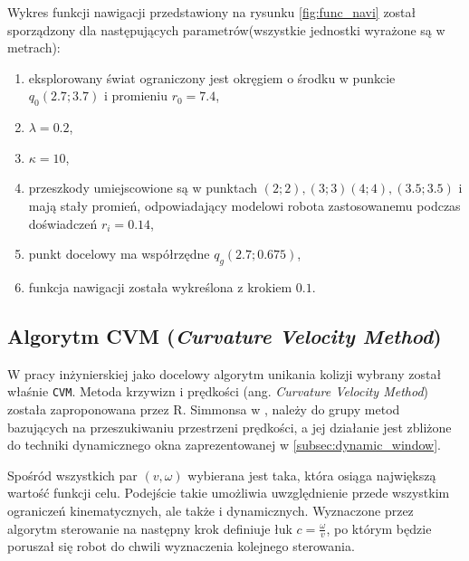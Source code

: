 	Wykres funkcji nawigacji przedstawiony na rysunku \ref{fig:func_navi} został sporządzony dla następujących parametrów(wszystkie jednostki wyrażone są w metrach):
	\begin{enumerate}
	\item eksplorowany świat ograniczony jest okręgiem o środku w punkcie $q_0(2.7;3.7)$ i promieniu $r_0 = 7.4$,
	\item $\lambda = 0.2$,
	\item $\kappa = 10$,
	\item przeszkody umiejscowione są w punktach $(2;2),(3;3)(4;4),(3.5;3.5)$ i mają stały promień, odpowiadający modelowi robota
	zastosowanemu podczas doświadczeń $r_i = 0.14 $,
	\item punkt docelowy ma współrzędne $q_g(2.7;0.675)$,
	\item funkcja nawigacji została wykreślona z krokiem $0.1$.
	\end{enumerate}

\subsection{Algorytm CVM (\textit{Curvature Velocity Method})}
	W pracy inżynierskiej \cite{inzynierka} jako docelowy algorytm unikania kolizji wybrany został właśnie \texttt{CVM}.
	Metoda krzywizn i prędkości (ang. \textit{Curvature Velocity Method}) została zaproponowana przez R. Simmonsa w
	\cite{CVM_2}, należy do grupy metod bazujących na przeszukiwaniu przestrzeni prędkości, a jej działanie
	jest zbliżone do techniki dynamicznego okna zaprezentowanej w \ref{subsec:dynamic_window}.

	Spośród wszystkich par $(v,\omega)$ wybierana jest taka, która osiąga największą wartość funkcji celu.
	Podejście takie umożliwia uwzględnienie przede wszystkim ograniczeń kinematycznych, ale także i dynamicznych.
	Wyznaczone przez algorytm sterowanie na następny krok definiuje łuk $c=\frac{\omega}{v}$, po którym będzie
	poruszał się robot do chwili wyznaczenia kolejnego sterowania.
	
